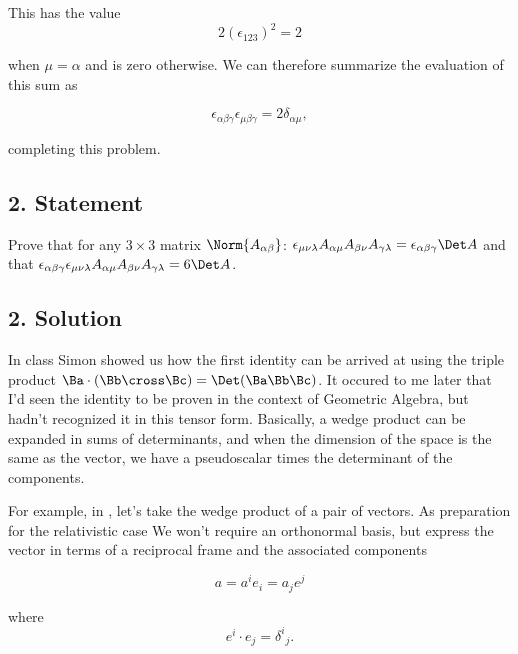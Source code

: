 This has the value
\begin{equation}\label{eqn:relElectroDynProblemSet3:250}
2 (\epsilon_{1 2 3})^2 = 2
\end{equation}

when $\mu = \alpha$ and is zero otherwise.  We can therefore summarize the evaluation of this sum as 

\begin{equation}\label{eqn:relElectroDynProblemSet3:270}
\epsilon_{\alpha \beta \gamma}
\epsilon_{\mu \beta \gamma}
=  2\delta_{\alpha\mu},
\end{equation}

completing this problem.

\subsection{2. Statement}

Prove that for any $3 \times 3$ matrix $\Norm{A_{\alpha\beta}}$: $\epsilon_{\mu\nu\lambda} A_{\alpha \mu} A_{\beta\nu} A_{\gamma\lambda} = \epsilon_{\alpha \beta \gamma} \Det A$ and that $\epsilon_{\alpha\beta\gamma} \epsilon_{\mu\nu\lambda} A_{\alpha \mu} A_{\beta\nu} A_{\gamma\lambda} = 6 \Det A$.  

\subsection{2. Solution}

In class Simon showed us how the first identity can be arrived at using the triple product $\Ba \cdot (\Bb \cross \Bc) = \Det(\Ba \Bb \Bc)$.  It occured to me later that I'd seen the identity to be proven in the context of Geometric Algebra, but hadn't recognized it in this tensor form.  Basically, a wedge product can be expanded in sums of determinants, and when the dimension of the space is the same as the vector, we have a pseudoscalar times the determinant of the components.

For example, in , let's take the wedge product of a pair of vectors.  As preparation for the relativistic  case We won't require an orthonormal basis, but express the vector in terms of a reciprocal frame and the associated components

\begin{equation}\label{eqn:relElectroDynProblemSet3:290}
a = a^i e_i = a_j e^j
\end{equation}

where 
\begin{equation}\label{eqn:relElectroDynProblemSet3:310}
e^i \cdot e_j = {\delta^i}_j.
\end{equation}

